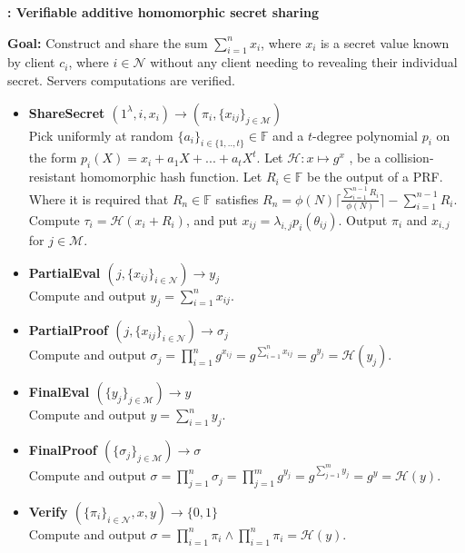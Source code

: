 \begin{algorithm}
\caption{\textbf{: Verifiable additive homomorphic secret sharing}}
\textbf{Goal:} Construct and share the sum $\sum_{i=1}^n x_i$, where $x_i$ is a secret value known by client $c_i$, where $i\in\mathcal{N}$ without any client needing to revealing their individual secret. Servers computations are verified. 
\vspace{2pt}
\hline
\vspace{2pt}
\begin{itemize}
  \item\textbf{ShareSecret $(1^\lambda,i,x_i)\xrightarrow[]{}(\pi_i,\{x_{ij}\}_{j\in\mathcal{M}})$}\\
Pick uniformly at random $\{a_i\}_{i\in\{1,..,t\}}\in\mathds{F}$ and a $t$-degree polynomial $p_i$ on the form $p_i(X) = x_i + a_1X+...+a_tX^t$. Let $\mathcal{H}:x\mapsto g^x$
, be a collision-resistant homomorphic hash function. Let $R_i\in\mathds{F}$ be the output of a PRF. Where it is required that  $R_n\in \mathds{F}$  satisfies
$R_n = \phi(N)\lceil \frac{\sum_{i=1}^{n-1}R_i}{\phi(N)}\rceil- \sum_{i=1}^{n-1}R_i $. Compute $\tau_i = \mathcal{H}(x_i+R_i)$, and put $x_{ij}=\lambda_{i,j}p_i(\theta_{ij})$.  Output $\pi_i$ and $x_{i,j}$ for $j\in\mathcal{M}$. 

\item\textbf{PartialEval $(j,\{x_{ij}\}_{i\in\mathcal{N}})\xrightarrow[]{}y_j$}\\
Compute and output $y_j = \sum_{i=1}^n x_{ij}$.

\item\textbf{PartialProof $(j,\{x_{ij}\}_{i\in\mathcal{N}})\xrightarrow[]{}\sigma_j$}\\
Compute and output $\sigma_j = \prod_{i=1}^n g^{x_{ij}} =  g^{\sum_{i=1}^n x_{ij}}= g^{y_j}=\mathcal{H}(y_j)$.

\item\textbf{FinalEval $(\{y_j\}_{j\in\mathcal{M}})\xrightarrow[]{}y$}\\
Compute and output $y = \sum_{i=1}^n y_{j}$.

\item\textbf{FinalProof $(\{\sigma_j\}_{j\in\mathcal{M}})\xrightarrow[]{}\sigma$}\\
Compute and output $\sigma = \prod_{j=1}^n \sigma_j = \prod_{j=1}^m g^{y_{j}} =  g^{\sum_{j=1}^m y_{j}}= g^{y}=\mathcal{H}(y)$.

\item\textbf{Verify $(\{\pi_i\}_{i\in\mathcal{N}},x,y)\xrightarrow[]{}\{0,1\}$}\\
Compute and output $\sigma= \prod_{i=1}^n \pi_i \wedge \prod_{i=1}^n \pi_i = \mathcal{H}(y)$.
\end{itemize}
\label{alg:VAHSS-HSS}
\end{algorithm}


